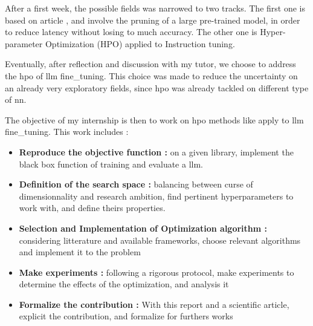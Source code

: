 After a first week, the possible fields was narrowed to two tracks. The first one is based on article \cite{klein_structural_2023}, and involve the pruning of a large pre-trained model, in order to reduce latency without losing to much accuracy. The other one \cite{tribes_hyperparameter_2024} is Hyper-parameter Optimization (HPO) applied to Instruction tuning.  

Eventually, after reflection and discussion with my tutor, we choose to address the \acrshort{hpo} of \acrshort{llm} \gls{fine_tuning}. This choice was made to reduce the uncertainty on an already very exploratory fields, since \acrshort{hpo} was already tackled on different type of \acrshort{nn}. 

The objective of my internship is then to work on \acrshort{hpo} methods like apply to \acrshort{llm} \gls{fine_tuning}. This work includes : 
\begin{itemize}
    \item \textbf{Reproduce the objective function :} on a given library, implement the black box function of training and evaluate a \acrshort{llm}.
    \item \textbf{Definition of the search space : }balancing between curse of dimensionnality and research ambition, find pertinent \glspl{hyperparameter} to work with, and define theirs properties.
    \item \textbf{Selection and Implementation of Optimization algorithm :} considering litterature and available frameworks, choose relevant algorithms and implement it to the problem
    \item \textbf{Make experiments :} following a rigorous protocol, make experiments to determine the effects of the optimization, and analysis it
    \item \textbf{Formalize the contribution :} With this report and a scientific article, explicit the contribution, and formalize for furthers works
\end{itemize}


